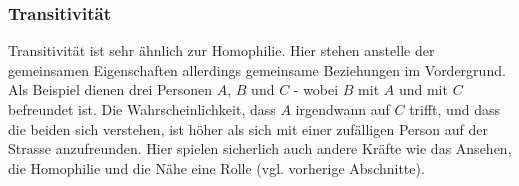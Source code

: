 \subsubsection{Transitivität}
Transitivität ist sehr ähnlich zur Homophilie. Hier stehen anstelle der gemeinsamen Eigenschaften allerdings gemeinsame Beziehungen im Vordergrund.
Als Beispiel dienen drei Personen $A$, $B$ und $C$ - wobei $B$ mit $A$ und mit $C$ befreundet ist.
Die Wahrscheinlichkeit, dass $A$ irgendwann auf $C$ trifft, und dass die beiden sich verstehen, ist höher als sich mit einer zufälligen Person auf
der Strasse anzufreunden. Hier spielen sicherlich auch andere Kräfte wie das Ansehen, die Homophilie und die Nähe eine Rolle (vgl. vorherige Abschnitte).
